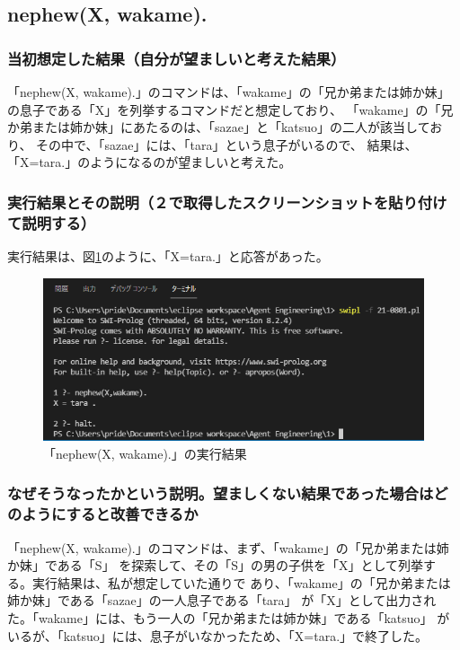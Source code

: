 \subsection{nephew(X, wakame).}
\subsubsection{当初想定した結果（自分が望ましいと考えた結果）}
「nephew(X, wakame).」のコマンドは、「wakame」の「兄か弟または姉か妹」の息子である「X」を列挙するコマンドだと想定しており、
「wakame」の「兄か弟または姉か妹」にあたるのは、「sazae」と「katsuo」の二人が該当しており、
その中で、「sazae」には、「tara」という息子がいるので、
結果は、「X=tara.」のようになるのが望ましいと考えた。

\subsubsection{実行結果とその説明（２で取得したスクリーンショットを貼り付けて説明する）}
実行結果は、図\ref{graph:3}のように、「X=tara.」と応答があった。
\begin{figure}[hbtp]
  \centering
  \caption{「nephew(X, wakame).」の実行結果}
  \label{graph:3}
  \includegraphics[scale = 1]{21-0801-03.png}
\end{figure}

\subsubsection{なぜそうなったかという説明。望ましくない結果であった場合はどのようにすると改善できるか}
「nephew(X, wakame).」のコマンドは、まず、「wakame」の「兄か弟または姉か妹」である「S」
を探索して、その「S」の男の子供を「X」として列挙する。実行結果は、私が想定していた通りで
あり、「wakame」の「兄か弟または姉か妹」である「sazae」の一人息子である「tara」
が「X」として出力された。「wakame」には、もう一人の「兄か弟または姉か妹」である「katsuo」
がいるが、「katsuo」には、息子がいなかったため、「X=tara.」で終了した。
\clearpage

